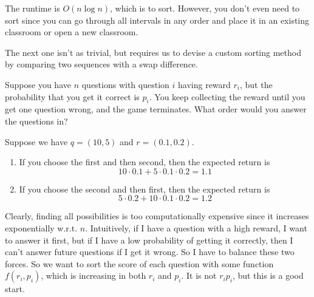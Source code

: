 \begin{example}
\begin{algorithm}[H]
\begin{algorithmic}
          \State {}
        \EndFunction
      \end{algorithmic}
    \end{algorithm}

    The runtime is $O(n \log{n})$, which is to sort. However, you don't even need to sort since you can go through all intervals in any order and place it in an existing classroom or open a new classroom. 
  \end{example}

  The next one isn't as trivial, but requires us to devise a custom sorting method by comparing two sequences with a swap difference. 

  \begin{example}
    \label{ex:quiz-problem}
    Suppose you have $n$ questions with question $i$ having reward $r_i$, but the probability that you get it correct is $p_i$. You keep collecting the reward until you get one question wrong, and the game terminates. What order would you answer the questions in? 

    Suppose we have $q = (10, 5)$ and $r = (0.1, 0.2)$. 
    \begin{enumerate}
      \item If you choose the first and then second, then the expected return is 
        \begin{equation}
          10 \cdot 0.1 + 5 \cdot 0.1 \cdot 0.2 = 1.1 
        \end{equation}

      \item If you choose the second and then first, then the expected return is 
        \begin{equation}
          5 \cdot 0.2 + 10 \cdot 0.1 \cdot 0.2 = 1.2
        \end{equation}
    \end{enumerate}
    Clearly, finding all possibilities is too computationally expensive since it increases exponentially w.r.t. $n$. Intuitively, if I have a question with a high reward, I want to answer it first, but if I have a low probability of getting it correctly, then I can't answer future questions if I get it wrong. So I have to balance these two forces. So we want to sort the score of each question with some function $f(r_i, p_i)$, which is increasing in both $r_i$ and $p_i$. It is not $r_i p_i$, but this is a good start. 
    

\end{example}
